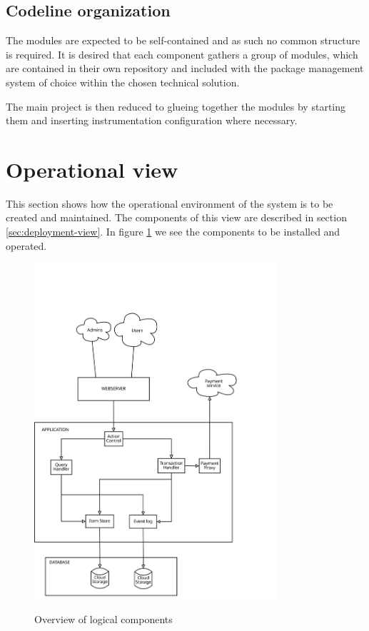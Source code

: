 \subsection{Codeline organization}
\label{sec:codel-organ}
The modules are expected to be self-contained and as such no common structure
is required. It is desired that each component gathers a group of modules,
which are contained in their own repository and included with the package
management system of choice within the chosen technical solution.

The main project is then reduced to glueing together the modules by starting
them and inserting instrumentation configuration where necessary.

\section{Operational view}
\label{sec:operational-view}
This section shows how the operational environment of the system is to be created and maintained. The components of this view are described in section \ref{sec:deployment-view}. In figure \ref{fig:logic_comp} we see the components to be installed and operated.

\begin{figure}[h!]
  \centering
  \caption{Overview of logical components}
  \includegraphics[width=0.8\textwidth]{figures/deployment_view}
  \label{fig:logic_comp}
\end{figure}


